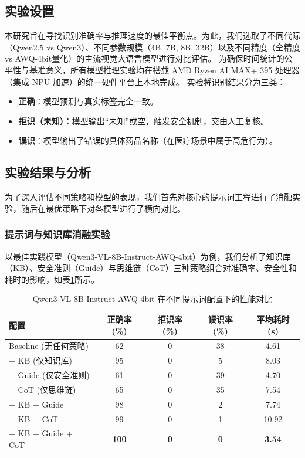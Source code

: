\documentclass[11pt,a4paper]{ctexart}
\begin{document}
\subsection{实验设置}
本研究旨在寻找识别准确率与推理速度的最佳平衡点。为此，我们选取了不同代际（Qwen2.5 vs Qwen3）、不同参数规模（4B, 7B, 8B, 32B）以及不同精度（全精度 vs AWQ-4bit量化）的主流视觉大语言模型进行对比评估。
为确保时间统计的公平性与基准意义，所有模型推理实验均在搭载 AMD Ryzen AI MAX+ 395 处理器（集成 NPU 加速）的统一硬件平台上本地完成。
实验将识别结果分为三类：
\begin{itemize}
    \item \textbf{正确}：模型预测与真实标签完全一致。
    \item \textbf{拒识（未知）}：模型输出“未知”或空，触发安全机制，交由人工复核。
    \item \textbf{误识}：模型输出了错误的具体药品名称（在医疗场景中属于高危行为）。
\end{itemize}

\subsection{实验结果与分析}
为了深入评估不同策略和模型的表现，我们首先对核心的提示词工程进行了消融实验，随后在最优策略下对各模型进行了横向对比。

\subsubsection{提示词与知识库消融实验}
以最佳实践模型（Qwen3-VL-8B-Instruct-AWQ-4bit）为例，我们分析了知识库（KB）、安全准则（Guide）与思维链（CoT）三种策略组合对准确率、安全性和耗时的影响，如表\ref{tab:ablation}所示。

\begin{table}[h]
\centering
\caption{Qwen3-VL-8B-Instruct-AWQ-4bit 在不同提示词配置下的性能对比}
\label{tab:ablation}
\begin{tabular}{lcccc}
\toprule
\textbf{配置} & \textbf{正确率 (\%)} & \textbf{拒识率 (\%)} & \textbf{误识率 (\%)} & \textbf{平均耗时 (s)} \\
\midrule
Baseline (无任何策略) & 62 & 0 & 38 & 4.61 \\
+ KB (仅知识库) & 95 & 0 & 5 & 8.03 \\
+ Guide (仅安全准则) & 61 & 0 & 39 & 4.70 \\
+ CoT (仅思维链) & 65 & 0 & 35 & 7.54 \\
+ KB + Guide & 98 & 0 & 2 & 7.74 \\
+ KB + CoT & 99 & 0 & 1 & 10.92 \\
+ KB + Guide + CoT & \textbf{100} & \textbf{0} & \textbf{0} & \textbf{3.54} \\
\bottomrule
\end{tabular}
\end{table}
\end{document}
